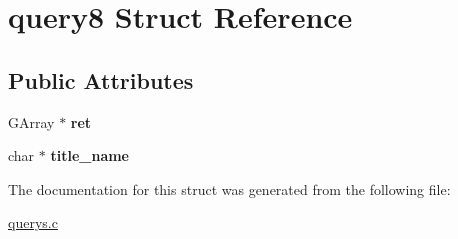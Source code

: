 \hypertarget{structquery8}{}\section{query8 Struct Reference}
\label{structquery8}
\subsection*{Public Attributes}
\begin{DoxyCompactItemize}
\item 
G\+Array $\ast$ {\bfseries ret}\hypertarget{structquery8_a1f45ff09323e01e371110e6e69086e2a}{}\label{structquery8_a1f45ff09323e01e371110e6e69086e2a}

\item 
char $\ast$ {\bfseries title\+\_\+name}\hypertarget{structquery8_a10b49a3668d562d954d9fc349f51a6f4}{}\label{structquery8_a10b49a3668d562d954d9fc349f51a6f4}

\end{DoxyCompactItemize}


The documentation for this struct was generated from the following file\+:\begin{DoxyCompactItemize}
\item 
\hyperlink{querys_8c}{querys.\+c}\end{DoxyCompactItemize}
